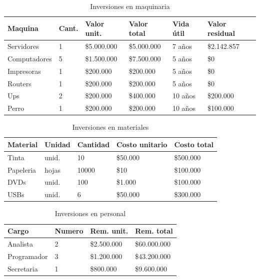 \documentclass[a4paper, 12pt, oneside]{article}
\begin{document}
	\begin{table}
		\caption{Inversiones en maquinaria}
		\begin{tabular}{ | p{3cm} | p{1cm} | p{2.5cm} | p{2.5cm} | p{1cm} | p{2cm} | }
		\hline
		Maquina & Cant. & Valor unit. & Valor total & Vida útil & Valor residual \\
		\hline					
		Servidores & 1 & \$5.000.000 & \$5.000.000 & 7 años & \$2.142.857 \\
		\hline					
		Computadores & 5 & \$1.500.000 & \$7.500.000 & 5 años & \$0 \\
		\hline
		Impresoras & 1 & \$200.000 & \$200.000 & 5 años & \$0 \\ 
		\hline
		Routers & 1 & \$200.000 & \$200.000 & 5 años & \$0 \\
		\hline
		Ups & 2 & \$200.000 & \$400.000 & 10 años & \$200.000 \\
		\hline
		Perro & 1 & \$200.000 & \$200.000 & 10 años & \$100.000 \\
		\hline
		\end{tabular}
		\label{tb:invMaquinaria}
	\end{table}

	\begin{table}
		\caption{Inversiones en materiales}
		\begin{tabular}{ | p{3cm} | p{1.5cm} | p{1.5cm} | p{2cm} | p{2cm} | }
		\hline
		Material & Unidad & Cantidad & Costo unitario & Costo total \\
		\hline
		Tinta & unid. & 10 & \$50.000 & \$500.000 \\ 
		\hline					
		Papeleria & hojas & 10000 & \$10 & \$100.000 \\
		\hline
		DVDs & unid. & 100 & \$1.000 & \$100.000 \\
		\hline
		USBs & unid. & 6 & \$50.000 & \$300.000 \\
		\hline
		\end{tabular}
		\label{tb:invMateriales}
	\end{table}

	\begin{table}
		\caption{Inversiones en personal}
		\begin{tabular}{ | p{3cm} | p{2cm} | p{2cm} | p{2cm} | }
		\hline
		Cargo & Numero & Rem. unit. & Rem. total \\
		\hline
		Analista & 2 & \$2.500.000 & \$60.000.000 \\
		\hline					
		Programador & 3 & \$1.200.000 & \$43.200.000 \\
		\hline
		Secretaria & 1 & \$800.000 & \$9.600.000 \\
		\hline
		\end{tabular}
		\label{tb:invPersonal}
	\end{table}
\end{document}
